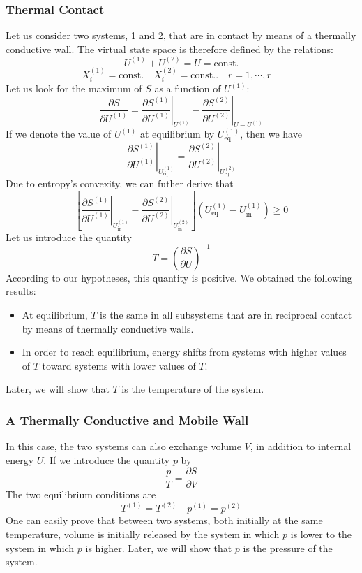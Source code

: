 \documentclass[cyan]{elegantnote}
\begin{document}
\subsubsection{Thermal Contact}
Let us consider two systems, 1 and 2, that are in contact by means of a thermally conductive wall. The virtual state space is therefore defined by the relations:
\[U^{(1)} + U^{(2)} = U = \mathrm{const.}\]
\[X^{(1)}_{i} = \mathrm{const}. \quad X^{(2)}_{i} = \mathrm{const.}. \quad r = 1,\cdots,r \quad \]
Let us look for the maximum of $S$ as a function of $U^{(1)}$:
\[\frac{\partial S}{\partial U^{(1)}} = \left. \frac{\partial S^{(1)}}{\partial U^{(1)}} \right|_{U^{(1)}} -  \left. \frac{\partial S^{(2)}}{\partial U^{(2)}} \right|_{U-U^{(1)}}\]
If we denote the value of $U^{(1)}$ at equilibrium by $U^{(1)}_{\mathrm{eq}}$, then we have
\[\left. \frac{\partial S^{(1)}}{\partial U^{(1)}} \right|_{U^{(1)}_{\mathrm{eq}}} =  \left. \frac{\partial S^{(2)}}{\partial U^{(2)}} \right|_{U^{(2)}_{\mathrm{eq}}}\]
Due to entropy's convexity, we can futher derive that
\[\left[ \left. \frac{\partial S^{(1)}}{\partial U^{(1)}} \right|_{U^{(1)}_{\mathrm{in}}} -  \left. \frac{\partial S^{(2)}}{\partial U^{(2)}} \right|_{U^{(2)}_{\mathrm{in}}}\right] (U^{(1)}_{\mathrm{eq}} - U^{(1)}_{\mathrm{in}}) \geq 0\]
Let us introduce the quantity
\[T = \left( \frac{\partial S}{\partial U} \right)^{-1}\]
According to our hypotheses, this quantity is positive. We obtained the following results:
\begin{itemize}
\item At equilibrium, $T$ is the same in all subsystems that are in reciprocal contact by means of thermally conductive walls.
\item In order to reach equilibrium, energy shifts from systems with higher values of $T$ toward systems with lower values of $T$.
\end{itemize}
Later, we will show that $T$ is the temperature of the system.

\subsubsection{A Thermally Conductive and Mobile Wall}
In this case, the two systems can also exchange volume $V$, in addition to internal energy $U$. If we introduce the quantity $p$ by
\[\frac{p}{T} =  \frac{\partial S}{\partial V} \]
The two equilibrium conditions are
\[T^{(1)} = T^{(2)} \quad p^{(1)} = p^{(2)}\]
One can easily prove that between two systems, both initially at the same temperature, volume is initially released by the system in which $p$ is lower to the system in which $p$ is higher. Later, we will show that $p$ is the pressure of the system.
\end{document}
